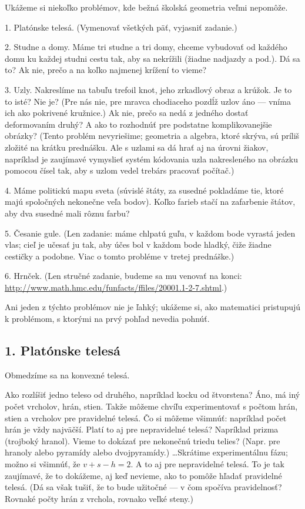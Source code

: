 \documentclass[a4paper]{article}
\begin{document}
Ukážeme si niekoľko problémov, kde bežná školská geometria veľmi nepomôže.

1. Platónske telesá. (Vymenovať všetkých päť, vyjasniť zadanie.)

2. Studne a domy. Máme tri studne a tri domy, chceme vybudovať od každého domu ku každej studni cestu tak, aby sa nekrížili (žiadne nadjazdy a pod.).
Dá sa to? Ak nie, prečo a na koľko najmenej krížení to vieme?

3. Uzly. Nakreslíme na tabuľu trefoil knot, jeho zrkadlový obraz a krúžok. Je to to isté? Nie je? (Pre nás nie, pre mravca chodiaceho pozdĺž uzlov áno --- vníma ich ako pokrivené kružnice.) Ak nie, prečo sa nedá z jedného dostať deformovaním druhý? A ako to rozhodnúť pre podstatne komplikovanejšie obrázky? (Tento problém nevyriešime; geometria a algebra, ktoré skrýva, sú príliš zložité na krátku prednášku. Ale s uzlami sa dá hrať aj na úrovni žiakov, napríklad je zaujímavé vymyslieť systém kódovania uzla nakresleného na obrázku pomocou čísel tak, aby s uzlom vedel trebárs pracovať počítač.)

4. Máme politickú mapu sveta (súvislé štáty, za susedné pokladáme tie, ktoré majú spoločných nekonečne veľa bodov). Koľko farieb stačí na zafarbenie štátov, aby dva susedné mali rôznu farbu?

5. Česanie gule. (Len zadanie: máme chlpatú guľu, v každom bode vyrastá jeden vlas; cieľ je učesať ju tak, aby účes bol v každom bode hladký, čiže žiadne cestičky a podobne. Viac o tomto probléme v tretej prednáške.)

6. Hrnček. (Len stručné zadanie, budeme sa mu venovať na konci: \url{http://www.math.hmc.edu/funfacts/ffiles/20001.1-2-7.shtml}.)

Ani jeden z týchto problémov nie je ľahký; ukážeme si, ako matematici pristupujú k problémom, s ktorými na prvý pohľad nevedia pohnúť.

\subsection*{1. Platónske telesá}

Obmedzíme sa na konvexné telesá.

Ako rozlíšiť jedno teleso od druhého, napríklad kocku od štvorstena? Áno, má iný počet vrcholov, hrán, stien. Takže môžeme chvíľu experimentovať s počtom hrán, stien a vrcholov pre pravidelné telesá. Čo si môžeme všimnúť: napríklad počet hrán je vždy najväčší. Platí to aj pre nepravidelné telesá? Napríklad prizma (trojboký hranol). Vieme to dokázať pre nekonečnú triedu telies? (Napr. pre hranoly alebo pyramídy alebo dvojpyramídy.) \dots Skrátime experimentálnu fázu; možno si všimnúť, že $v + s - h = 2$. A to aj pre nepravidelné telesá. To je tak zaujímavé, že to dokážeme, aj keď nevieme, ako to pomôže hľadať pravidelné telesá. (Dá sa však tušiť, že to bude užitočné --- v čom spočíva pravidelnosť? Rovnaké počty hrán z vrchola, rovnako veľké steny.)
\end{document}
